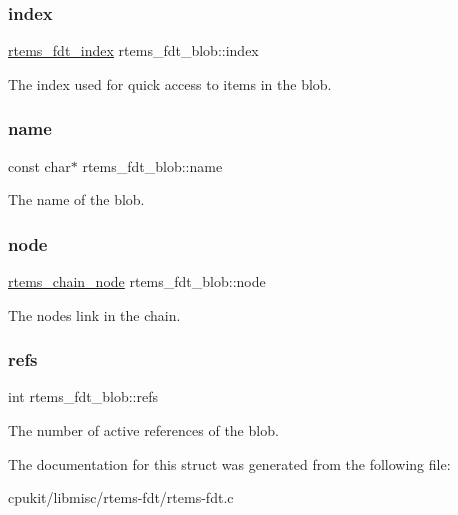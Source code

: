 \subsubsection{\texorpdfstring{index}{index}}
{\footnotesize\ttfamily \mbox{\hyperlink{structrtems__fdt__index}{rtems\+\_\+fdt\+\_\+index}} rtems\+\_\+fdt\+\_\+blob\+::index}

The index used for quick access to items in the blob. \mbox{\label{structrtems__fdt__blob_ad16c5ea5def721aced5a6f8109ae4092}} 
\subsubsection{\texorpdfstring{name}{name}}
{\footnotesize\ttfamily const char$\ast$ rtems\+\_\+fdt\+\_\+blob\+::name}

The name of the blob. \mbox{\label{structrtems__fdt__blob_a1d6846a217c9cbac57a2a0946c6fc82b}} 
\subsubsection{\texorpdfstring{node}{node}}
{\footnotesize\ttfamily \mbox{\hyperlink{structChain__Node__struct}{rtems\+\_\+chain\+\_\+node}} rtems\+\_\+fdt\+\_\+blob\+::node}

The node\textquotesingle{}s link in the chain. \mbox{\label{structrtems__fdt__blob_a628d2916f0fd6de43d41e08f4098ab64}} 
\subsubsection{\texorpdfstring{refs}{refs}}
{\footnotesize\ttfamily int rtems\+\_\+fdt\+\_\+blob\+::refs}

The number of active references of the blob. 

The documentation for this struct was generated from the following file\+:\begin{DoxyCompactItemize}
\item 
cpukit/libmisc/rtems-\/fdt/rtems-\/fdt.\+c\end{DoxyCompactItemize}

